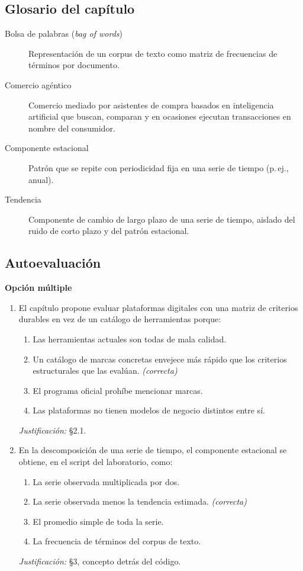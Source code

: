 \subsection*{Glosario del capítulo}
\begin{description}
  \item[Bolsa de palabras (\textit{bag of words})] Representación de un
  corpus de texto como matriz de frecuencias de términos por documento.
  \item[Comercio agéntico] Comercio mediado por asistentes de compra basados
  en inteligencia artificial que buscan, comparan y en ocasiones ejecutan
  transacciones en nombre del consumidor.
  \item[Componente estacional] Patrón que se repite con periodicidad fija en
  una serie de tiempo (p.\,ej., anual).
  \item[Tendencia] Componente de cambio de largo plazo de una serie de
  tiempo, aislado del ruido de corto plazo y del patrón estacional.
\end{description}

\subsection*{Autoevaluación}

\textbf{Opción múltiple}

\begin{enumerate}
  \item El capítulo propone evaluar plataformas digitales con una matriz de
  criterios durables en vez de un catálogo de herramientas porque:
  \begin{enumerate}
    \item[a)] Las herramientas actuales son todas de mala calidad.
    \item[b)] Un catálogo de marcas concretas envejece más rápido que los criterios estructurales que las evalúan. \textit{(correcta)}
    \item[c)] El programa oficial prohíbe mencionar marcas.
    \item[d)] Las plataformas no tienen modelos de negocio distintos entre sí.
  \end{enumerate}
  \textit{Justificación:} §2.1.

  \item En la descomposición de una serie de tiempo, el componente
  estacional se obtiene, en el script del laboratorio, como:
  \begin{enumerate}
    \item[a)] La serie observada multiplicada por dos.
    \item[b)] La serie observada menos la tendencia estimada. \textit{(correcta)}
    \item[c)] El promedio simple de toda la serie.
    \item[d)] La frecuencia de términos del corpus de texto.
  \end{enumerate}
  \textit{Justificación:} §3, concepto detrás del código.
\end{enumerate}

